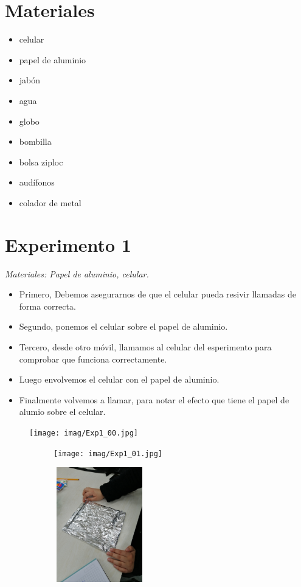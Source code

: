 \documentclass[a4paper,12pt]{article}
\begin{document}
\section*{Materiales}
\begin{multicols}{2}
\begin{itemize}
    \item celular
    \item papel de aluminio
    \item jabón
    \item agua
    \item globo
    \item bombilla
    \item bolsa ziploc
    \item audífonos
    \item colador de metal 
\end{itemize}
\end{multicols}


\section*{Experimento 1}
\textit{Materiales: Papel de aluminio, celular.}
\begin{itemize}
    \item Primero, Debemos asegurarnos de que el celular pueda resivir llamadas de forma correcta.
    \item Segundo, ponemos el celular sobre el papel de aluminio.
    \item Tercero, desde otro móvil, llamamos al celular del esperimento para comprobar que funciona correctamente.
    \item Luego envolvemos el celular con el papel de aluminio.
    \item Finalmente volvemos a llamar, para notar el efecto que tiene el papel de alumio sobre el celular.
\end{itemize}
\begin{figure}[h]
    \begin{subfigure}
        \raggedright
        \texttt{[image: imag/Exp1\_00.jpg]}
        \end{subfigure}
    \begin{subfigure}
        \centering
        \texttt{[image: imag/Exp1\_01.jpg]}
    \end{subfigure}
    \begin{subfigure}
        \raggedleft
        \includegraphics[width=4cm, height=5cm]{imag/Exp1_02.jpg}
    \end{subfigure}
\end{figure}
\end{document}

